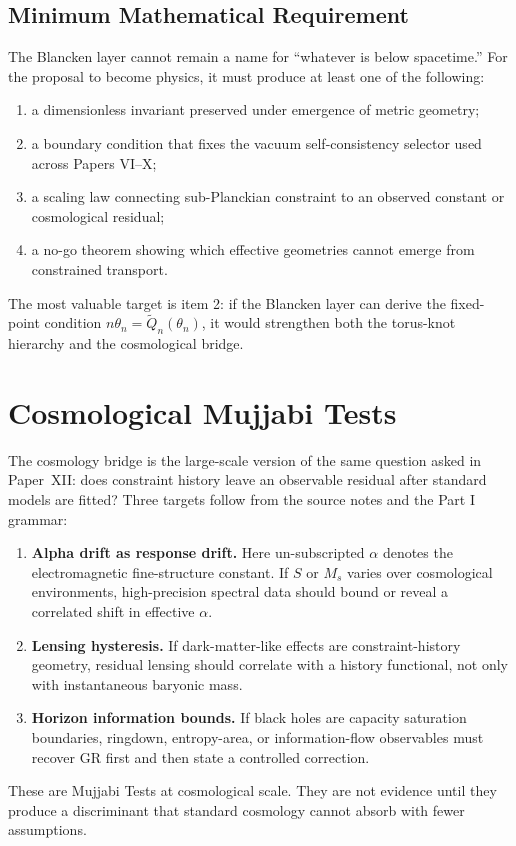 \documentclass[11pt]{article}
\begin{document}
\subsection{Minimum Mathematical Requirement}

The Blancken layer cannot remain a name for ``whatever is below spacetime.''
For the proposal to become physics, it must produce at least one of the
following:
\begin{enumerate}
    \item a dimensionless invariant preserved under emergence of metric
    geometry;
    \item a boundary condition that fixes the vacuum self-consistency
    selector used across Papers VI--X;
    \item a scaling law connecting sub-Planckian constraint to an observed
    constant or cosmological residual;
    \item a no-go theorem showing which effective geometries cannot emerge
    from constrained transport.
\end{enumerate}
The most valuable target is item 2: if the Blancken layer can derive the
fixed-point condition $n\theta_n=\widetilde{Q}_n(\theta_n)$, it would
strengthen both the torus-knot hierarchy and the cosmological bridge.

\section{Cosmological Mujjabi Tests}

The cosmology bridge is the large-scale version of the same question asked in
Paper~XII: does constraint history leave an observable residual after standard
models are fitted? Three targets follow from the source notes and the Part I
grammar:
\begin{enumerate}
    \item \textbf{Alpha drift as response drift.} Here un-subscripted $\alpha$
    denotes the electromagnetic fine-structure constant. If $S$ or $M_s$ varies over
    cosmological environments, high-precision spectral data should bound or
    reveal a correlated shift in effective $\alpha$.
    \item \textbf{Lensing hysteresis.} If dark-matter-like effects are
    constraint-history geometry, residual lensing should correlate with a
    history functional, not only with instantaneous baryonic mass.
    \item \textbf{Horizon information bounds.} If black holes are capacity
    saturation boundaries, ringdown, entropy-area, or information-flow
    observables must recover GR first and then state a controlled correction.
\end{enumerate}
These are Mujjabi Tests at cosmological scale. They are not evidence until they
produce a discriminant that standard cosmology cannot absorb with fewer
assumptions.
\end{document}
